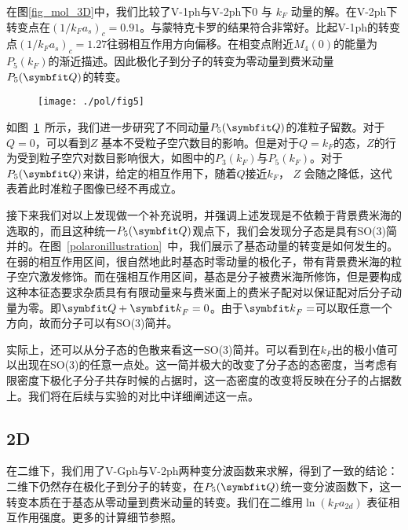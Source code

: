 在图\ref{fig_mol_3D}中，我们比较了V-1ph与V-2ph下$0$ 与 $k_F$ 动量的解。在V-2ph下转变点在$(1/k_Fa_s)_c=0.91$。与蒙特克卡罗的结果符合非常好\cite{Prokoffermi,Prokofbold}。比起V-1ph的转变点$(1/k_Fa_s)_c=1.27$往弱相互作用方向偏移。在相变点附近$M_4(0)$的能量为$P_5(k_F)$的渐近描述。因此极化子到分子的转变为零动量到费米动量$P_5(\Vector{Q})$的转变。

\begin{figure}[t]
\centering
\texttt{[image: ./pol/fig5]}
\label{fig_z}
\end{figure}

如图~\ref{fig_z}~所示，我们进一步研究了不同动量$P_5(\Vector{Q})$的准粒子留数。对于$Q=0$，可以看到$Z$ 基本不受粒子空穴数目的影响。但是对于$Q=k_F$的态，$Z$的行为受到粒子空穴对数目影响很大，如图中的$P_3(k_F)$与$P_5(k_F)$。对于$P_5(\Vector{Q})$来讲，给定的相互作用下，随着$Q$接近$k_F$， $Z$ 会随之降低，这代表着此时准粒子图像已经不再成立。


接下来我们对以上发现做一个补充说明，并强调上述发现是不依赖于背景费米海的选取的，而且这种统一$P_5(\Vector{Q})$观点下，我们会发现分子态是具有SO(3)简并的。在图~\ref{polaronillustration}~中，我们展示了基态动量的转变是如何发生的。在弱的相互作用区间，很自然地此时基态时零动量的极化子，带有背景费米海的粒子空穴激发修饰。而在强相互作用区间，基态是分子被费米海所修饰，但是要构成这种本征态要求杂质具有有限动量来与费米面上的费米子配对以保证配对后分子动量为零。即${\Vector{Q} }+{\Vector{k}}_F=0$。由于${\Vector{k}}_F=$可以取任意一个方向，故而分子可以有SO(3)简并。

实际上，还可以从分子态的色散来看这一SO(3)简并。可以看到在$k_F$出的极小值可以出现在SO(3)的任意一点处。这一简并极大的改变了分子态的态密度，当考虑有限密度下极化子分子共存时候的占据时，这一态密度的改变将反映在分子的占据数上。我们将在后续与实验的对比中详细阐述这一点。

\subsection{2D}
在二维下，我们用了V-Gph与V-2ph两种变分波函数来求解，得到了一致的结论：二维下仍然存在极化子到分子的转变，在$P_5(\Vector{Q})$统一变分波函数下，这一转变本质在于基态从零动量到费米动量的转变。我们在二维用$\ln(k_Fa_{2d})$ 表征相互作用强度。更多的计算细节参照\cite{Peng2021Nature}。



